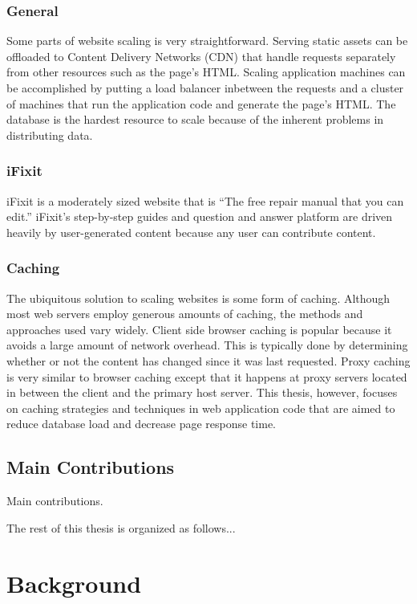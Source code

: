 \documentclass[12pt]{ucthesis}
\begin{document}
\subsection{General}
Some parts of website scaling is very straightforward.
Serving static assets can be offloaded to Content Delivery Networks (CDN) that handle requests separately from other resources such as the page's HTML.
Scaling application machines can be accomplished by putting a load balancer inbetween the requests and a cluster of machines that run the application code and generate the page's HTML.
The database is the hardest resource to scale because of the inherent problems in distributing data.

\subsection{iFixit}
iFixit is a moderately sized website that is ``The free repair manual that you can edit.''
iFixit's step-by-step guides and question and answer platform are driven heavily by user-generated content because any user can contribute content.

\subsection{Caching}
The ubiquitous solution to scaling websites is some form of caching.
Although most web servers employ generous amounts of caching, the methods and approaches used vary widely.
Client side browser caching is popular because it avoids a large amount of network overhead.
This is typically done by determining whether or not the content has changed since it was last requested.
Proxy caching is very similar to browser caching except that it happens at proxy servers located in between the client and the primary host server.
This thesis, however, focuses on caching strategies and techniques in web application code that are aimed to reduce database load and decrease page response time.

\section{Main Contributions}
Main contributions.

The rest of this thesis is organized as follows...


\chapter{Background}
\label{background}
\end{document}
